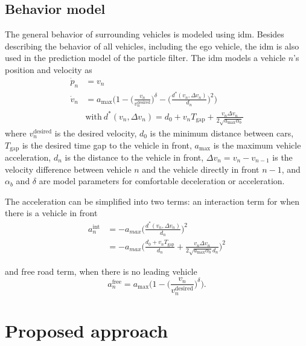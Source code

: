 \subsection{Behavior model}
\label{sec:driver_model}
The general behavior of surrounding vehicles is modeled using \gls{idm}. Besides describing the behavior of all vehicles, including the ego vehicle, the \gls{idm} is also used in the prediction model of the particle filter. The \gls{idm} models a vehicle $n$'s position and velocity as
\begin{align}
    \dot p_n & = v_n\\
    \dot v_n & = a_{\mathrm{max}}\Big(1-\Big(\frac{v_n}{v^\mathrm{desired}_n}\Big)^\delta-\Big( \frac{d^*(v_n,\Delta v_n)}{d_n}\Big)^2\Big) \label{eq:idm} \\
    & \mathrm{with ~} d^*(v_n, \Delta v_n) = d_0 + v_n T_{\mathrm{gap}} + \frac{v_n \Delta v_n}{2 \sqrt{a_{\mathrm{max}} \alpha_b}} \nonumber
\end{align}
where $v^\mathrm{desired}_n$ is the desired velocity, $d_0$ is the minimum distance between cars, $T_{\mathrm{gap}}$ is the desired time gap to the vehicle in front, $a_\mathrm{max}$ is the maximum vehicle acceleration, $d_n$ is the distance to the vehicle in front, $\Delta v_n = v_n - v_{n-1}$ is the velocity difference between vehicle $n$ and the vehicle directly in front $n-1$, and $\alpha_b$ and $\delta$ are model parameters for comfortable deceleration or acceleration.


The acceleration can be simplified into two terms: an interaction term for when there is a vehicle in front 
\begin{align}
     a^\text{int}_n &=  -a_{max} \Big(\frac{d^*(v_n,\Delta v_n)}{d_n} \Big) ^2  \nonumber \\
     &= -a_{max} \Big(\frac{d_0 + v_n T_{\mathrm{gap}}}{d_n} + \frac{v_n \Delta v_n}{2 \sqrt{a_{\mathrm{max}} \alpha_b} d_n} \Big) ^2
     \label{eq:idm_int}
\end{align}

and free road term, when there is no leading vehicle
\begin{equation}
    a^\text{free}_n= a_\mathrm{max}\Big(1-\Big(\frac{v_n}{v^\mathrm{desired}_n}\Big)^\delta\Big).
    \label{eq:idm_free}
\end{equation}


\section{Proposed approach}
\label{sec:approach}

